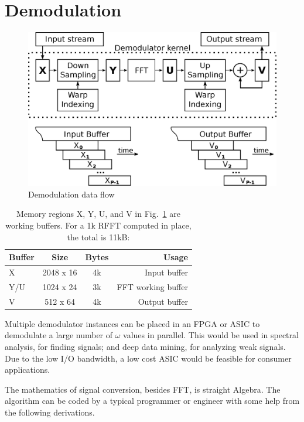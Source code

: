 \section{Demodulation}

\begin{figure}
	\centering
	\includegraphics[width=0.95\linewidth]{../source/demod_e}
	\caption[Emergent to Causal Time Demodulation]{Demodulation data flow}
	\label{fig:demod}
\end{figure}

\begin{table}
	\label{tab:memory}
	\caption{Memory regions X, Y, U, and V in Fig.~\ref{fig:demod}
	are working buffers. For a 1k RFFT computed in place, the total is 11kB:}
	\centering
	\begin{tabular}{lccr}
		\hline\hline
		Buffer & Size & Bytes & Usage \\ [0.5ex]
		\hline
		X & 2048 x 16 & 4k & Input buffer\\
		Y/U & 1024 x 24 & 3k & FFT working buffer\\
		V & 512 x 64 & 4k & Output buffer\\
		\hline
	\end{tabular}
\end{table}

Multiple demodulator instances can be placed in an FPGA or ASIC to demodulate a
large number of $\omega$ values in parallel. This would be used in spectral
analysis, for finding signals; and deep data mining, for analyzing weak signals.
Due to the low I/O bandwidth,
a low cost ASIC would be feasible for consumer applications.

The mathematics of signal conversion, besides FFT, is straight Algebra.
The algorithm can be coded by a typical programmer or engineer with some help
from the following derivations.

